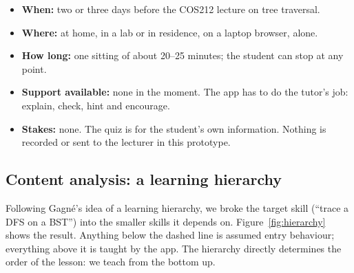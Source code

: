 \documentclass[11pt,a4paper]{article}
\begin{document}
\begin{itemize}
  \item \textbf{When:} two or three days before the COS212 lecture on tree traversal.
  \item \textbf{Where:} at home, in a lab or in residence, on a laptop browser, alone.
  \item \textbf{How long:} one sitting of about 20--25 minutes; the student can stop at any point.
  \item \textbf{Support available:} none in the moment. The app has to do the tutor's job:
        explain, check, hint and encourage.
  \item \textbf{Stakes:} none. The quiz is for the student's own information. Nothing is recorded
        or sent to the lecturer in this prototype.
\end{itemize}

\subsection{Content analysis: a learning hierarchy}

Following Gagné's idea of a learning hierarchy, we broke the target skill (``trace a DFS on a BST'')
into the smaller skills it depends on. Figure~\ref{fig:hierarchy} shows the result. Anything below
the dashed line is assumed entry behaviour; everything above it is taught by the app. The
hierarchy directly determines the order of the lesson: we teach from the bottom up.
\end{document}
